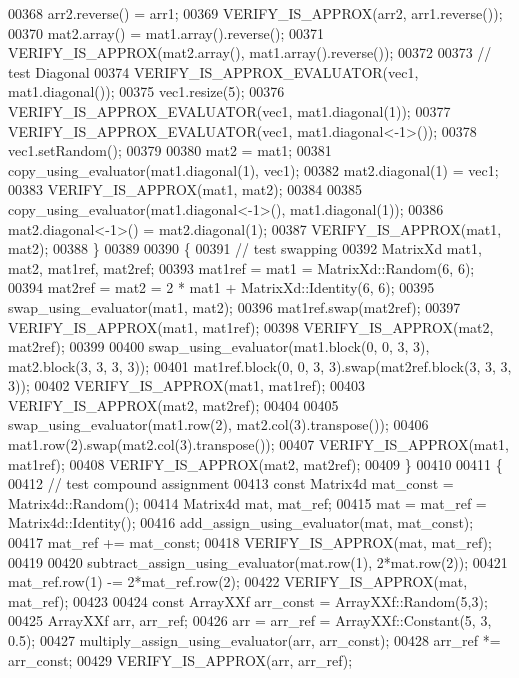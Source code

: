 \begin{DoxyCode}
00368     arr2.reverse() = arr1;
00369     VERIFY\_IS\_APPROX(arr2, arr1.reverse());
00370     mat2.array() = mat1.array().reverse();
00371     VERIFY\_IS\_APPROX(mat2.array(), mat1.array().reverse());
00372 
00373     \textcolor{comment}{// test Diagonal}
00374     VERIFY\_IS\_APPROX\_EVALUATOR(vec1, mat1.diagonal());
00375     vec1.resize(5);
00376     VERIFY\_IS\_APPROX\_EVALUATOR(vec1, mat1.diagonal(1));
00377     VERIFY\_IS\_APPROX\_EVALUATOR(vec1, mat1.diagonal<-1>());
00378     vec1.setRandom();
00379 
00380     mat2 = mat1;
00381     copy\_using\_evaluator(mat1.diagonal(1), vec1);
00382     mat2.diagonal(1) = vec1;
00383     VERIFY\_IS\_APPROX(mat1, mat2);
00384 
00385     copy\_using\_evaluator(mat1.diagonal<-1>(), mat1.diagonal(1));
00386     mat2.diagonal<-1>() = mat2.diagonal(1);
00387     VERIFY\_IS\_APPROX(mat1, mat2);
00388   \}
00389   
00390   \{
00391     \textcolor{comment}{// test swapping}
00392     MatrixXd mat1, mat2, mat1ref, mat2ref;
00393     mat1ref = mat1 = MatrixXd::Random(6, 6);
00394     mat2ref = mat2 = 2 * mat1 + MatrixXd::Identity(6, 6);
00395     swap\_using\_evaluator(mat1, mat2);
00396     mat1ref.swap(mat2ref);
00397     VERIFY\_IS\_APPROX(mat1, mat1ref);
00398     VERIFY\_IS\_APPROX(mat2, mat2ref);
00399 
00400     swap\_using\_evaluator(mat1.block(0, 0, 3, 3), mat2.block(3, 3, 3, 3));
00401     mat1ref.block(0, 0, 3, 3).swap(mat2ref.block(3, 3, 3, 3));
00402     VERIFY\_IS\_APPROX(mat1, mat1ref);
00403     VERIFY\_IS\_APPROX(mat2, mat2ref);
00404 
00405     swap\_using\_evaluator(mat1.row(2), mat2.col(3).transpose());
00406     mat1.row(2).swap(mat2.col(3).transpose());
00407     VERIFY\_IS\_APPROX(mat1, mat1ref);
00408     VERIFY\_IS\_APPROX(mat2, mat2ref);
00409   \}
00410 
00411   \{
00412     \textcolor{comment}{// test compound assignment}
00413     \textcolor{keyword}{const} Matrix4d mat\_const = Matrix4d::Random(); 
00414     Matrix4d mat, mat\_ref;
00415     mat = mat\_ref = Matrix4d::Identity();
00416     add\_assign\_using\_evaluator(mat, mat\_const);
00417     mat\_ref += mat\_const;
00418     VERIFY\_IS\_APPROX(mat, mat\_ref);
00419 
00420     subtract\_assign\_using\_evaluator(mat.row(1), 2*mat.row(2));
00421     mat\_ref.row(1) -= 2*mat\_ref.row(2);
00422     VERIFY\_IS\_APPROX(mat, mat\_ref);
00423 
00424     \textcolor{keyword}{const} ArrayXXf arr\_const = ArrayXXf::Random(5,3); 
00425     ArrayXXf arr, arr\_ref;
00426     arr = arr\_ref = ArrayXXf::Constant(5, 3, 0.5);
00427     multiply\_assign\_using\_evaluator(arr, arr\_const);
00428     arr\_ref *= arr\_const;
00429     VERIFY\_IS\_APPROX(arr, arr\_ref);

\end{DoxyCode}
